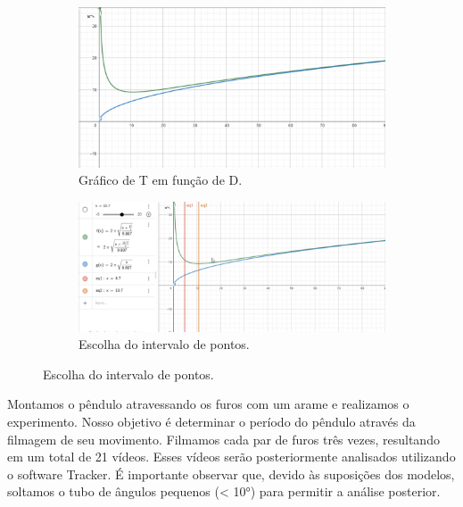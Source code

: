 \documentclass[hidelinks,a4paper,10pt]{article}
\begin{document}
\begin{figure}[H]
    \begin{subfigure}{0.4\textwidth }
        \centering
        \includegraphics[width=0.9\linewidth]{grafico1.png}
        \caption{Gráfico de T em função de D.}
        \label{fig:1.2}
    \end{subfigure}%
    \begin{subfigure}{0.5\textwidth }
        \centering
        \includegraphics[width=0.9\linewidth]{grafico2.png}
        \caption{Escolha do intervalo de pontos.}
        \label{fig: 1.3}
    \end{subfigure}
 \end{figure}


\qquad Montamos o pêndulo atravessando os furos com um arame e realizamos o experimento. Nosso objetivo é determinar o período do pêndulo através da filmagem de seu movimento. Filmamos cada par de furos três vezes, resultando em um total de 21 vídeos. Esses vídeos serão posteriormente analisados utilizando o software Tracker. É importante observar que, devido às suposições dos modelos, soltamos o tubo de ângulos pequenos (< 10°) para permitir a análise posterior.
\end{document}
